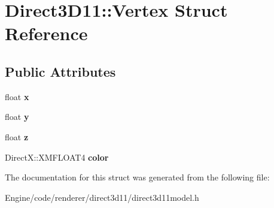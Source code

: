 \hypertarget{struct_direct3_d11_1_1_vertex}{}\section{Direct3\+D11\+:\+:Vertex Struct Reference}
\label{struct_direct3_d11_1_1_vertex}
\subsection*{Public Attributes}
\begin{DoxyCompactItemize}
\item 
\mbox{\label{struct_direct3_d11_1_1_vertex_a34b59379cc0c94178bab051ddfeb0efe}} 
float {\bfseries x}
\item 
\mbox{\label{struct_direct3_d11_1_1_vertex_a1e8e3131d904c6e145ec8703a8dc2671}} 
float {\bfseries y}
\item 
\mbox{\label{struct_direct3_d11_1_1_vertex_a034c3aaca62a387bea4112b7061bc0b5}} 
float {\bfseries z}
\item 
\mbox{\label{struct_direct3_d11_1_1_vertex_ae98bd6fdb3d12036f5068942c9a116a1}} 
Direct\+X\+::\+X\+M\+F\+L\+O\+A\+T4 {\bfseries color}
\end{DoxyCompactItemize}


The documentation for this struct was generated from the following file\+:\begin{DoxyCompactItemize}
\item 
Engine/code/renderer/direct3d11/direct3d11model.\+h\end{DoxyCompactItemize}

